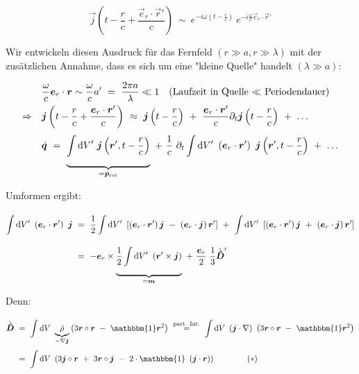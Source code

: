 \begin{equation*}
\vec{j}\left(t-\frac{r}{c} + \frac{\vec{e}_r \cdot\vec{r}'}{c}\right) \ \sim \ e^{-i\omega\left(t-\frac{r}{c}\right)} \ e^{-i\frac{\omega}{c} \vec{e}_r\cdot\vec{r}'}
\end{equation*}

Wir entwickeln diesen Ausdruck für das Fernfeld $(r\gg a, r \gg \lambda)$ mit der zusätzlichen Annahme, dass es sich um eine "kleine Quelle" handelt $(\lambda\gg a)$:

\begin{align*}
&\frac{\omega}{c} \vec{e}_r \cdot \vec{r} \sim \frac{\omega}{c}a' \ = \  \frac{2\pi a}{\lambda} \ll 1 \quad\text{(Laufzeit in Quelle $\ll$ Periodendauer)}\\
\Rightarrow\quad &\vec{j}\left(t-\frac{r}{c}+\frac{\vec{e}_r\cdot\vec{r}'}{c}\right) \ \approx \ \vec{j}\left(t-\frac{r}{c}\right) \ + \ \frac{\vec{e}_r\cdot\vec{r}'}{c}\partial_t\vec{j}\left(t-\frac{r}{c}\right) \ + \ \ldots\\
&\dot{\vec{q}}  \ = \ \underbrace{\Int{}{}{V'}\vec{j}\left(\vec{r}',t-\frac{r}{c}\right)}_{=\dot{\vec{p}}_{\text{ret}}} \ + \ \frac{1}{c} \ \partial_t \Int{}{}{V'}\left(\vec{e}_r\cdot\vec{r}'\right) \ \vec{j} \left(\vec{r}', t- \frac{r}{c}\right) \ + \ \ldots
\end{align*}

Umformen ergibt:

\begin{align*}
\Int{}{}{V'} \left(\vec{e}_r\cdot\vec{r}'\right) \ \vec{j}  \ &= \ \frac{1}{2}\Int{}{}{V'} \left[\left(\vec{e}_r\cdot\vec{r}'\right)\vec{j} \ - \ \left(\vec{e}_r \cdot \vec{j}\right)\vec{r}'\right] \ + \ \Int{}{}{V'} \left[\left(\vec{e}_r\cdot\vec{r}'\right)\vec{j} \ + \ \left(\vec{e}_r\cdot\vec{j}\right)\vec{r}'\right]\\
&= \ -\vec{e}_r \times\underbrace{\frac{1}{2}\Int{}{}{V'}\left(\vec{r}'\times\vec{j}\right)}_{=\vec{m}} \ + \ \frac{\vec{e}_r}{2} \ \frac{1}{3} \dot{\tens{D}}'
\end{align*}

Denn:

\begin{align*}
\dot{\tens{D}} \ &= \ \Int{}{}{V}\underbrace{\dot{\rho}}_{-\nabla\vec{j}} \left(3\vec{r}\circ\vec{r} \ - \ \mathbbm{1} \vec{r}^2\right)  \ \overset{\text{part. Int.}}{=} \ \Int{}{}{V} \left(\vec{j}\cdot\nabla\right) \ \left(3\vec{r}\circ\vec{r} \ - \ \mathbbm{1}\vec{r}^2\right)\\
&= \ \Int{}{}{V}\left(3\vec{j}\circ\vec{r} \ + \ 3\vec{r}\circ\vec{j} \ - \ 2 \cdot \mathbbm{1} \ \left(\vec{j}\cdot\vec{r}\right)\right) \qquad\qquad(*)
\end{align*}

